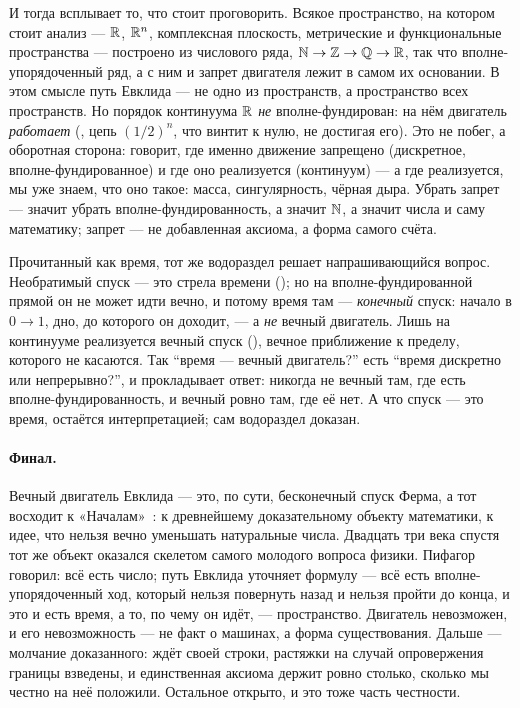 И тогда всплывает то, что стоит проговорить. Всякое пространство, на котором стоит анализ — $\mathbb{R}$,
$\mathbb{R}^n$, комплексная плоскость, метрические и функциональные пространства — построено из числового ряда,
$\mathbb{N} \to \mathbb{Z} \to \mathbb{Q} \to \mathbb{R}$, так что вполне-упорядоченный ряд, а с ним и запрет двигателя лежит в
самом их основании. В этом смысле путь Евклида — не одно из пространств, а пространство всех
пространств. Но порядок континуума $\mathbb{R}$ \emph{не} вполне-фундирован: на нём двигатель \emph{работает}
(, цепь $(1/2)^n$, что винтит к нулю, не достигая его). Это не побег, а
оборотная сторона:  говорит, где именно движение запрещено
(дискретное, вполне-фундированное) и где оно реализуется (континуум) — а где реализуется, мы уже знаем,
что оно такое: масса, сингулярность, чёрная дыра. Убрать запрет — значит убрать вполне-фундированность,
а значит $\mathbb{N}$, а значит числа и саму математику; запрет — не добавленная аксиома, а форма самого счёта.

Прочитанный как время, тот же водораздел решает напрашивающийся вопрос. Необратимый спуск --- это
стрела времени (); но на вполне-фундированной прямой он не может идти
вечно, и потому время там --- \emph{конечный} спуск: начало в $0 \to 1$, дно, до которого он доходит,
--- а \emph{не} вечный двигатель. Лишь на континууме реализуется вечный спуск
(), вечное приближение к пределу, которого не касаются. Так ``время ---
вечный двигатель?'' есть ``время дискретно или непрерывно?'', и 
прокладывает ответ: никогда не вечный там, где есть вполне-фундированность, и вечный ровно там, где её
нет. А что спуск --- это время, остаётся интерпретацией; сам водораздел доказан.

\paragraph{Финал.}
Вечный двигатель Евклида — это, по сути, бесконечный спуск Ферма, а тот восходит к
«Началам»~\cite{euclid-elements}: к древнейшему доказательному объекту математики, к идее, что нельзя
вечно уменьшать натуральные числа. Двадцать три века спустя тот же объект оказался скелетом самого
молодого вопроса физики. Пифагор говорил: всё есть число; путь Евклида уточняет формулу — всё есть
вполне-упорядоченный ход, который нельзя повернуть назад и нельзя пройти до конца, и это и есть время,
а то, по чему он идёт, — пространство. Двигатель невозможен, и его невозможность — не факт о машинах, а
форма существования. Дальше — молчание доказанного:  ждёт своей строки,
растяжки на случай опровержения границы взведены, и единственная аксиома держит ровно столько, сколько
мы честно на неё положили. Остальное открыто, и это тоже часть честности.
